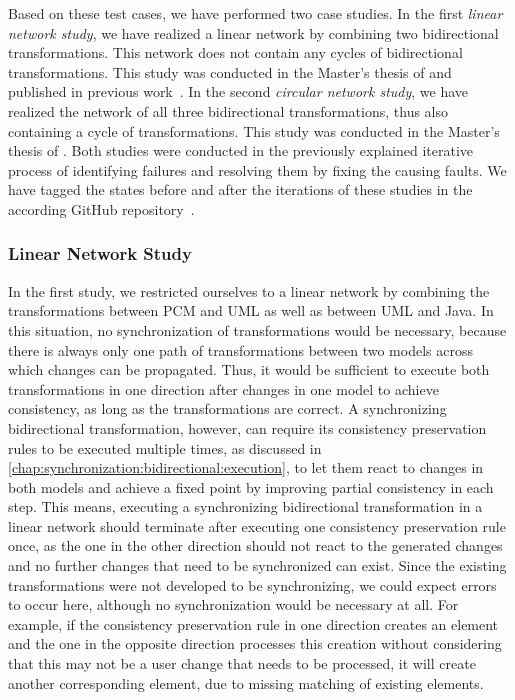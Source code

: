 Based on these test cases, we have performed two case studies.
In the first \emph{linear network study}, we have realized a linear network by combining two bidirectional transformations. This network does not contain any cycles of bidirectional transformations.
This study was conducted in the Master's thesis of  and published in previous work~.
In the second \emph{circular network study}, we have realized the network of all three bidirectional transformations, thus also containing a cycle of transformations.
This study was conducted in the Master's thesis of .
Both studies were conducted in the previously explained iterative process of identifying failures and resolving them by fixing the causing faults.
We have tagged the states before and after the iterations of these studies in the according GitHub repository~.

\subsubsection*{Linear Network Study} 

In the first study, we restricted ourselves to a linear network by combining the transformations between \gls{PCM} and \gls{UML} as well as between \gls{UML} and Java.
In this situation, no synchronization of transformations would be necessary, because there is always only one path of transformations between two models across which changes can be propagated.
Thus, it would be sufficient to execute both transformations in one direction after changes in one model to achieve consistency, as long as the transformations are correct.
A synchronizing bidirectional transformation, however, can require its consistency preservation rules to be executed multiple times, as discussed in \autoref{chap:synchronization:bidirectional:execution}, to let them react to changes in both models and achieve a fixed point by improving partial consistency in each step.
This means, executing a synchronizing bidirectional transformation in a linear network should terminate after executing one consistency preservation rule once, as the one in the other direction should not react to the generated changes and no further changes that need to be synchronized can exist.
Since the existing transformations were not developed to be synchronizing, we could expect errors to occur here, although no synchronization would be necessary at all.
For example, if the consistency preservation rule in one direction creates an element and the one in the opposite direction processes this creation without considering that this may not be a user change that needs to be processed, it will create another corresponding element, due to missing matching of existing elements.

